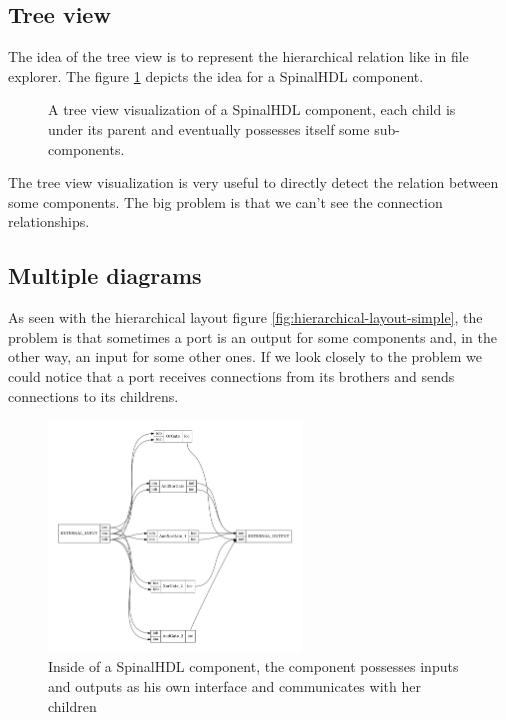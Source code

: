 \subsection{Tree view}

The idea of the tree view is to represent the hierarchical relation like in file
explorer. The figure \ref{fig:tree-view} depicts the idea for a SpinalHDL
component.

\begin{figure}[H]
  \centering
  \caption[SpinalHDL's Component visualization with tree view]{A tree view
    visualization of a SpinalHDL component, each child is under its parent and
    eventually possesses itself some sub-components.}
  \label{fig:tree-view}
\end{figure}

The tree view visualization is very useful to directly detect the relation
between some components. The big problem is that we can't see the connection
relationships.

\subsection{Multiple diagrams}

As seen with the hierarchical layout figure
\ref{fig:hierarchical-layout-simple}, the problem is that sometimes a port is an
output for some components and, in the other way, an input for some other
ones. If we look closely to the problem we could notice that a port receives
connections from its brothers and sends connections to its childrens.

\begin{figure}[H]
  \centering
  \includegraphics[width=0.6\textwidth]{img/HierarchicComponent.pdf}
  \caption[SpinalHDL Component inside]{Inside of a SpinalHDL component, the
    component possesses inputs and outputs as his own interface and communicates
  with her children}
  \label{fig:hierarchic-component}
\end{figure}

